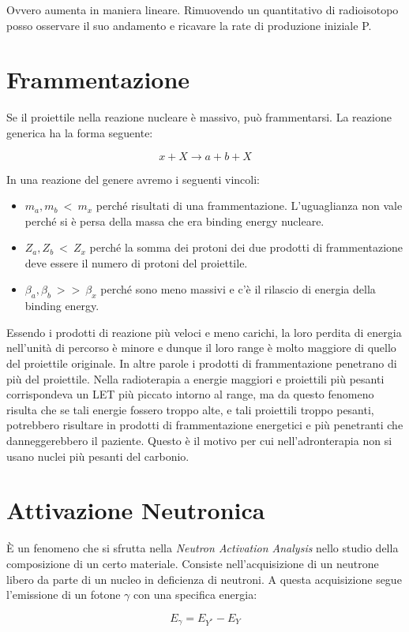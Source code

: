 Ovvero aumenta in maniera lineare. Rimuovendo un quantitativo di radioisotopo posso osservare il suo andamento e ricavare la rate di produzione iniziale P.

\section{Frammentazione}

Se il proiettile nella reazione nucleare è massivo, può frammentarsi. La reazione generica ha la forma seguente:

\begin{equation}
x+X \longrightarrow a+b+X
\end{equation}

In una reazione del genere avremo i seguenti vincoli:

\begin{itemize}
\item $m_a, m_b  \ < \ m_x$ perché risultati di una frammentazione. L'uguaglianza non vale perché si è persa della massa che era binding energy nucleare.
\item $Z_a, Z_b \ < \ Z_x$ perché la somma dei protoni dei due prodotti di frammentazione deve essere il numero di protoni del proiettile.
\item $\beta_a, \beta_b \ >> \ \beta_x$ perché sono meno massivi e c'è il rilascio di energia della binding energy.
\end{itemize}

Essendo i prodotti di reazione più veloci e meno carichi, la loro perdita di energia nell'unità di percorso è minore e dunque il loro range è molto maggiore di quello del proiettile originale. 
In altre parole i prodotti di frammentazione penetrano di più del proiettile.
Nella radioterapia a energie maggiori e proiettili più pesanti corrispondeva un LET più piccato intorno al range, ma da questo fenomeno risulta che se tali energie fossero troppo alte, e tali proiettili troppo pesanti, potrebbero risultare in prodotti di frammentazione energetici e più penetranti che danneggerebbero il paziente. Questo è il motivo per cui nell'adronterapia non si usano nuclei più pesanti del carbonio.

\section{Attivazione Neutronica}
\`E un fenomeno che si sfrutta nella \emph{Neutron Activation Analysis} nello studio della composizione di un certo materiale. Consiste nell'acquisizione di un neutrone libero da parte di un nucleo in deficienza di neutroni. A questa acquisizione segue l'emissione di un fotone $\gamma$ con una specifica energia:

\begin{equation}
E_{\gamma}=E_{Y^*}-E_{Y}
\end{equation}

